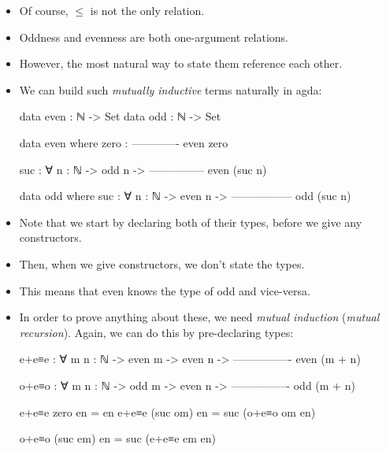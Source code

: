 \documentclass{lecturenotes}
\begin{document}
\begin{itemize}
\item Of course, $\leq$ is not the only relation.
\item Oddness and evenness are both one-argument relations.
\item However, the most natural way to state them reference each other.
\item We can build such \emph{mutually inductive} terms naturally in agda:
\begin{code}
data even : ℕ -> Set
data odd : ℕ -> Set

data even where
  zero :
       -------------
         even zero

  suc : ∀ {n : ℕ} ->
             odd n ->
        ---------------
          even (suc n)


data odd where
  suc : ∀ {n : ℕ} ->
             even n ->
        -----------------
           odd (suc n)
\end{code}
\item Note that we start by declaring both of their types, before we give any constructors.
\item Then, when we give constructors, we don't state the types.
\item This means that \textsf{even} knows the type of \textsf{odd} and vice-versa.
\item In order to prove anything about these, we need \emph{mutual induction} (\emph{mutual recursion}).
  Again, we can do this by pre-declaring types:
\begin{code}
e+e≡e : ∀ {m n : ℕ} ->
             even m ->
             even n ->
        ----------------
          even (m + n)

o+e≡o : ∀ {m n : ℕ} ->
             odd m ->
             even n ->
        ----------------
          odd (m + n)

e+e≡e zero en = en
e+e≡e (suc om) en = suc (o+e≡o om en)

o+e≡o (suc em) en = suc (e+e≡e em en)
\end{code}
\end{itemize}
\end{document}
